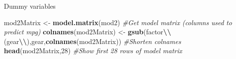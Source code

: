 \documentclass[
  ignorenonframetext,
  aspectratio=169]{beamer}
\newenvironment{Shaded}{\begin{snugshade}}{\end{snugshade}}
\newcommand{\CommentTok}[1]{\textcolor[rgb]{0.56,0.35,0.01}{\textit{#1}}}
\newcommand{\DecValTok}[1]{\textcolor[rgb]{0.00,0.00,0.81}{#1}}
\newcommand{\FunctionTok}[1]{\textcolor[rgb]{0.13,0.29,0.53}{\textbf{#1}}}
\newcommand{\NormalTok}[1]{#1}
\newcommand{\OtherTok}[1]{\textcolor[rgb]{0.56,0.35,0.01}{#1}}
\newcommand{\SpecialCharTok}[1]{\textcolor[rgb]{0.81,0.36,0.00}{\textbf{#1}}}
\newcommand{\StringTok}[1]{\textcolor[rgb]{0.31,0.60,0.02}{#1}}
\let\oldShaded\Shaded %
\let\endoldShaded\endShaded
\renewenvironment{Shaded}{\scriptsize\oldShaded}{\endoldShaded}
\begin{document}
\begin{frame}[fragile]{Dummy variables}
\protect\hypertarget{dummy-variables-2}{}
\tiny

\begin{Shaded}
\begin{Highlighting}[]
\NormalTok{mod2Matrix }\OtherTok{\textless{}{-}} \FunctionTok{model.matrix}\NormalTok{(mod2) }\CommentTok{\#Get model matrix (columns used to predict mpg)}
\FunctionTok{colnames}\NormalTok{(mod2Matrix) }\OtherTok{\textless{}{-}} \FunctionTok{gsub}\NormalTok{(}\StringTok{\textquotesingle{}factor}\SpecialCharTok{\textbackslash{}\textbackslash{}}\StringTok{(gear}\SpecialCharTok{\textbackslash{}\textbackslash{}}\StringTok{)\textquotesingle{}}\NormalTok{,}\StringTok{\textquotesingle{}gear\textquotesingle{}}\NormalTok{,}\FunctionTok{colnames}\NormalTok{(mod2Matrix)) }\CommentTok{\#Shorten colnames}
\FunctionTok{head}\NormalTok{(mod2Matrix,}\DecValTok{28}\NormalTok{) }\CommentTok{\#Show first 28 rows of model matrix}
\end{Highlighting}
\end{Shaded}


\end{frame}
\end{document}
